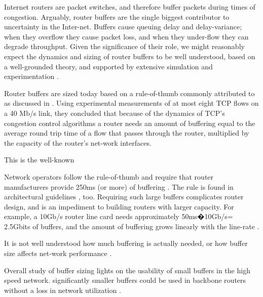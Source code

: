 \documentclass[letterpaper]{article}
\begin{document}
\par Internet routers are packet switches, and therefore buffer packets during times of congestion.  Arguably, router buffers are the single biggest contributor to uncertainty in the Inter-net. Buffers cause queuing delay and delay-variance; when they overflow they cause packet loss, and when they under-flow they can degrade throughput. Given the significance of their role, we might reasonably expect the dynamics and sizing of router buffers to be well understood, based on a well-grounded theory, and supported by extensive simulation and experimentation \cite{REF1}.

\par Router buffers are sized today based on a rule-of-thumb commonly attributed to as discussed in \cite{REF3} . Using experimental measurements of at most eight TCP flows on a 40 Mb/s link, they concluded that because of the dynamics of TCP's congestion control algorithms  a router needs an amount of buffering equal to the average round trip time of a flow that passes through the router, multiplied by the capacity of the router's net-work interfaces. 
\par This is the well-known \cite{REF1}


\par Network operators follow the rule-of-thumb and require that router manufacturers provide 250ms (or more) of buffering \cite{REF4}. The rule is found in architectural guidelines \cite{REF5}, too. Requiring such large buffers complicates router design, and is an impediment to building routers with larger capacity. For example, a 10Gb/s router line card needs approximately 50ms�10Gb/s= 2.5Gbits of buffers, and the amount of buffering grows linearly with the line-rate \cite{REF2}.

\par It is not well understood how much buffering is actually needed, or how buffer size affects net-work performance \cite{REF6}.

\par Overall  study of buffer sizing lights on the usability of small buffers in the high speed network.  significantly smaller buffers could be used in backbone routers  without a loss in network utilization \cite{REF1}.
\end{document}
